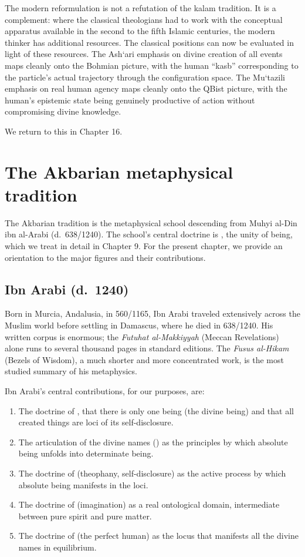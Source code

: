 The modern reformulation is not a refutation of the kalam tradition.
It is a complement: where the classical theologians had to work with
the conceptual apparatus available in the second to the fifth Islamic
centuries, the modern thinker has additional resources. The classical
positions can now be evaluated in light of these resources. The
Ash`ari emphasis on divine creation of all events maps cleanly onto
the Bohmian picture, with the human ``kasb'' corresponding to the
particle's actual trajectory through the configuration space. The
Mu`tazili emphasis on real human agency maps cleanly onto the QBist
picture, with the human's epistemic state being genuinely productive
of action without compromising divine knowledge.

We return to this in Chapter 16.

\section{The Akbarian metaphysical tradition}
\label{sec:akbarian}

The Akbarian tradition is the metaphysical school descending from
Muhyi al-Din ibn al-Arabi (d.~638/1240). The school's central doctrine
is , the unity of being, which we treat in
detail in Chapter 9. For the present chapter, we provide an
orientation to the major figures and their contributions.

\subsection{Ibn Arabi (d.~1240)}

Born in Murcia, Andalusia, in 560/1165, Ibn Arabi traveled
extensively across the Muslim world before settling in Damascus,
where he died in 638/1240. His written corpus is enormous; the
\textit{Futuhat al-Makkiyyah} (Meccan Revelations) alone runs to
several thousand pages in standard editions. The \textit{Fusus
al-Hikam} (Bezels of Wisdom), a much shorter and more concentrated
work, is the most studied summary of his metaphysics.

Ibn Arabi's central contributions, for our purposes, are:

\begin{enumerate}[leftmargin=2em]
    \item The doctrine of , that there is
    only one being (the divine being) and that all created things
    are loci of its self-disclosure.
    \item The articulation of the divine names () as the principles by which absolute being unfolds into
    determinate being.
    \item The doctrine of  (theophany,
    self-disclosure) as the active process by which absolute being
    manifests in the loci.
    \item The doctrine of  (imagination) as a real
    ontological domain, intermediate between pure spirit and pure
    matter.
    \item The doctrine of  (the perfect
    human) as the locus that manifests all the divine names in
    equilibrium.
\end{enumerate}

